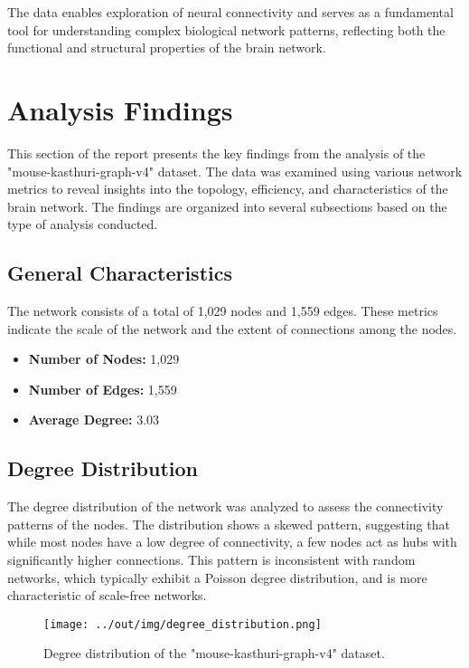 \documentclass[
	report, %
	11pt, %
]{CSUniSchoolLabReport}
\begin{document}
		The data enables exploration of neural connectivity and serves as a fundamental tool for understanding complex biological network patterns, reflecting both the functional and structural properties of the brain network.
		
\section{Analysis Findings}

This section of the report presents the key findings from the analysis of the "mouse-kasthuri-graph-v4" dataset. The data was examined using various network metrics to reveal insights into the topology, efficiency, and characteristics of the brain network. The findings are organized into several subsections based on the type of analysis conducted.

\subsection{General Characteristics}

The network consists of a total of 1,029 nodes and 1,559 edges. These metrics indicate the scale of the network and the extent of connections among the nodes.

\begin{itemize}
    \item \textbf{Number of Nodes:} 1,029
    \item \textbf{Number of Edges:} 1,559
    \item \textbf{Average Degree:} 3.03
\end{itemize}

\subsection{Degree Distribution}

The degree distribution of the network was analyzed to assess the connectivity patterns of the nodes. The distribution shows a skewed pattern, suggesting that while most nodes have a low degree of connectivity, a few nodes act as hubs with significantly higher connections. This pattern is inconsistent with random networks, which typically exhibit a Poisson degree distribution, and is more characteristic of scale-free networks.

\begin{figure}[h]
    \centering
	\texttt{[image: ../out/img/degree\_distribution.png]}
    \caption{Degree distribution of the "mouse-kasthuri-graph-v4" dataset.}
    \label{fig:deg_dist}
\end{figure}
\end{document}
